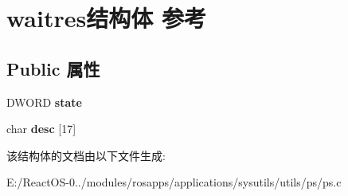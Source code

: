 \hypertarget{structwaitres}{}\section{waitres结构体 参考}
\label{structwaitres}
\subsection*{Public 属性}
\begin{DoxyCompactItemize}
\item 
\mbox{\label{structwaitres_a06ba5873c318ebef0eccd3d162c85e02}} 
D\+W\+O\+RD {\bfseries state}
\item 
\mbox{\label{structwaitres_a9f936af1278d38c58e10b8350e7c14d9}} 
char {\bfseries desc} \mbox{[}17\mbox{]}
\end{DoxyCompactItemize}


该结构体的文档由以下文件生成\+:\begin{DoxyCompactItemize}
\item 
E\+:/\+React\+O\+S-\/0../modules/rosapps/applications/sysutils/utils/ps/ps.\+c\end{DoxyCompactItemize}
